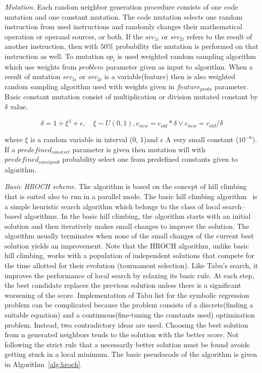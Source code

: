 \documentclass{bmcart}
\begin{document}
\textit{Mutation}. Each random neighbor generation procedure consists of one code mutation and one constant mutation. The code mutation selects one random instruction from used instructions and randomly changes their mathematical operation or operand sources, or both. If the $src_{1i}$ or $src_{2i}$ refers to the result of another instruction, then with $50\%$ probability the mutation is performed on that instruction as well. To mutation $op_i$ is used weighted random sampling algorithm which use weights from $problem$ parameter given as input to algorithm. When a result of mutation $src_{1i}$ or $src_{2i}$ is a variable(feature) then is also weighted random sampling algorithm used with weights given in $feature_{probs}$ parameter. Basic constant mutation consist of multiplication or division mutated constant by $\delta$ value.

\begin{equation}\label{eq:hroch-mutation}
	\delta = 1 + \xi^4 + \epsilon, \quad \xi \sim U(0, 1),
	c_{new} = c_{old} * \delta \lor c_{new} = c_{old} / \delta
\end{equation}

where $\xi$ is a random variable in interval (0, 1)and $\epsilon$ A very small constant ($10^{-6}$). If a $predefined_{const set}$ parameter is given then mutation will with $predefined_{const prob}$ probability select one from predefined constants given to algorithm.

\textit{Basic HROCH scheme}. The algorithm is based on the concept of hill climbing that is suited also to run in a parallel mode. The basic hill climbing algorithm~\cite{ohashi2003hill} is  a simple heuristic search algorithm which belongs to the class of local search--based algorithms. In the basic hill climbing, the algorithm starts with an initial solution and then iteratively makes small changes to improve the solution. The algorithm usually terminates when none of the small changes of the current best solution yields an improvement. Note that the HROCH algorithm, unlike basic hill climbing, works with a population of independent solutions that compete for the time allotted for their evolution (tournament selection). Like Tabu's search, it improves the performance of local search by relaxing its basic rule. At each step, the best candidate replaces the previous solution unless there is a significant worsening of the score. Implementation of Tabu list for the symbolic regression problem can be complicated because the problem consists of a discrete(finding a suitable equation) and a continuous(fine-tuning the constants used) optimization problem. Instead, two contradictory ideas are used. Choosing the best solution from n generated neighbors tends to the solution with the better score. Not following the strict rule that a necessarily better solution must be found avoids getting stuck in a local minimum. The basic pseudocode of the algorithm is given in Algorithm~\ref{alg:hroch}.
\end{document}
